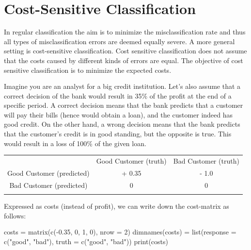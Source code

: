 \documentclass[
]{scrbook}
\newenvironment{Shaded}{\begin{snugshade}}{\end{snugshade}}
\newcommand{\AttributeTok}[1]{\textcolor[rgb]{0.77,0.63,0.00}{#1}}
\newcommand{\DecValTok}[1]{\textcolor[rgb]{0.00,0.00,0.81}{#1}}
\newcommand{\FloatTok}[1]{\textcolor[rgb]{0.00,0.00,0.81}{#1}}
\newcommand{\FunctionTok}[1]{\textcolor[rgb]{0.00,0.00,0.00}{#1}}
\newcommand{\NormalTok}[1]{#1}
\newcommand{\OtherTok}[1]{\textcolor[rgb]{0.56,0.35,0.01}{#1}}
\newcommand{\SpecialCharTok}[1]{\textcolor[rgb]{0.00,0.00,0.00}{#1}}
\newcommand{\StringTok}[1]{\textcolor[rgb]{0.31,0.60,0.02}{#1}}
\renewenvironment{Shaded} {\begin{snugshade}\small} {\end{snugshade}}
\begin{document}
\hypertarget{cost-sens}{%
\section{Cost-Sensitive Classification}\label{cost-sens}}

In regular classification the aim is to minimize the misclassification rate and thus all types of misclassification errors are deemed equally severe.
A more general setting is cost-sensitive classification.
Cost sensitive classification does not assume that the costs caused by different kinds of errors are equal.
The objective of cost sensitive classification is to minimize the expected costs.

Imagine you are an analyst for a big credit institution.
Let's also assume that a correct decision of the bank would result in 35\% of the profit at the end of a specific period.
A correct decision means that the bank predicts that a customer will pay their bills (hence would obtain a loan), and the customer indeed has good credit.
On the other hand, a wrong decision means that the bank predicts that the customer's credit is in good standing, but the opposite is true.
This would result in a loss of 100\% of the given loan.

\begin{longtable}[]{@{}ccc@{}}
\toprule
& Good Customer (truth) & Bad Customer (truth) \\ \addlinespace
\midrule
\endhead
Good Customer (predicted) & + 0.35 & - 1.0 \\ \addlinespace
Bad Customer (predicted) & 0 & 0 \\ \addlinespace
\bottomrule
\end{longtable}

Expressed as costs (instead of profit), we can write down the cost-matrix as follows:

\begin{Shaded}
\begin{Highlighting}[]
\NormalTok{costs }\OtherTok{=} \FunctionTok{matrix}\NormalTok{(}\FunctionTok{c}\NormalTok{(}\SpecialCharTok{{-}}\FloatTok{0.35}\NormalTok{, }\DecValTok{0}\NormalTok{, }\DecValTok{1}\NormalTok{, }\DecValTok{0}\NormalTok{), }\AttributeTok{nrow =} \DecValTok{2}\NormalTok{)}
\FunctionTok{dimnames}\NormalTok{(costs) }\OtherTok{=} \FunctionTok{list}\NormalTok{(}\AttributeTok{response =} \FunctionTok{c}\NormalTok{(}\StringTok{"good"}\NormalTok{, }\StringTok{"bad"}\NormalTok{), }\AttributeTok{truth =} \FunctionTok{c}\NormalTok{(}\StringTok{"good"}\NormalTok{, }\StringTok{"bad"}\NormalTok{))}
\FunctionTok{print}\NormalTok{(costs)}
\end{Highlighting}
\end{Shaded}
\end{document}
